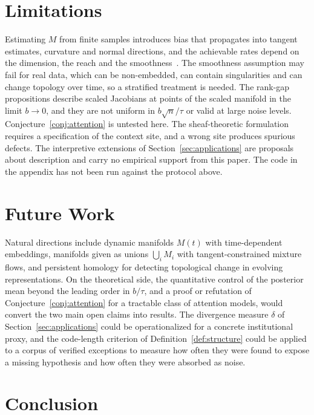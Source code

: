 \documentclass[11pt,a4paper]{article}
\theoremstyle{definition}
\theoremstyle{remark}
\begin{document}
\section{Limitations}

Estimating $M$ from finite samples introduces bias that propagates into
tangent estimates, curvature and normal directions, and the achievable rates
depend on the dimension, the reach and the smoothness~\cite{aamari2019nonasymptotic}. The
smoothness assumption may fail for real data, which can be non-embedded, can
contain singularities and can change topology over time, so a stratified
treatment is needed. The rank-gap propositions describe scaled Jacobians at points of the scaled manifold in the limit $b\to0$, and they are not uniform in $b\sqrt n/\tau$ or valid at large noise levels. Conjecture~\ref{conj:attention} is untested here.
The sheaf-theoretic formulation requires a specification of the context
site, and a wrong site produces spurious defects. The interpretive extensions
of Section~\ref{sec:applications} are proposals about description and carry
no empirical support from this paper. The code in the appendix has not been
run against the protocol above.

\section{Future Work}\label{sec:future}

Natural directions include dynamic manifolds $M(t)$ with time-dependent
embeddings, manifolds given as unions $\bigcup_iM_i$ with tangent-constrained
mixture flows, and persistent homology for detecting topological change in
evolving representations. On the theoretical side, the quantitative control of
the posterior mean beyond the leading order in $b/\tau$, and a proof or
refutation of Conjecture~\ref{conj:attention} for a tractable class of
attention models, would convert the two main open claims into results. The
divergence measure $\delta$ of Section~\ref{sec:applications} could be
operationalized for a concrete institutional proxy, and the code-length
criterion of Definition~\ref{def:structure} could be applied to a corpus of
verified exceptions to measure how often they were found to expose a missing
hypothesis and how often they were absorbed as noise.

\section*{Conclusion}
\end{document}
